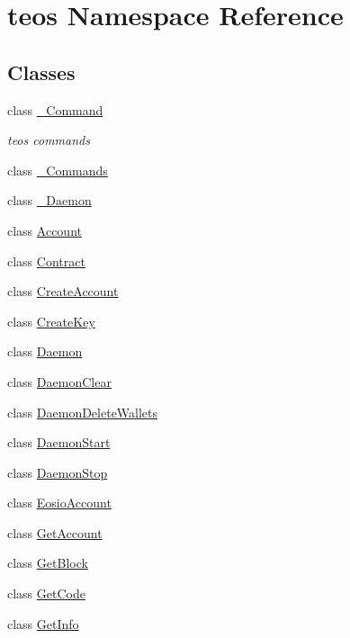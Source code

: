 \hypertarget{namespaceteos}{}\section{teos Namespace Reference}
\label{namespaceteos}
\subsection*{Classes}
\begin{DoxyCompactItemize}
\item 
class \mbox{\hyperlink{classteos_1_1__Command}{\+\_\+\+Command}}
\begin{DoxyCompactList}\small\item\em teos commands \end{DoxyCompactList}\item 
class \mbox{\hyperlink{classteos_1_1__Commands}{\+\_\+\+Commands}}
\item 
class \mbox{\hyperlink{classteos_1_1__Daemon}{\+\_\+\+Daemon}}
\item 
class \mbox{\hyperlink{classteos_1_1Account}{Account}}
\item 
class \mbox{\hyperlink{classteos_1_1Contract}{Contract}}
\item 
class \mbox{\hyperlink{classteos_1_1CreateAccount}{Create\+Account}}
\item 
class \mbox{\hyperlink{classteos_1_1CreateKey}{Create\+Key}}
\item 
class \mbox{\hyperlink{classteos_1_1Daemon}{Daemon}}
\item 
class \mbox{\hyperlink{classteos_1_1DaemonClear}{Daemon\+Clear}}
\item 
class \mbox{\hyperlink{classteos_1_1DaemonDeleteWallets}{Daemon\+Delete\+Wallets}}
\item 
class \mbox{\hyperlink{classteos_1_1DaemonStart}{Daemon\+Start}}
\item 
class \mbox{\hyperlink{classteos_1_1DaemonStop}{Daemon\+Stop}}
\item 
class \mbox{\hyperlink{classteos_1_1EosioAccount}{Eosio\+Account}}
\item 
class \mbox{\hyperlink{classteos_1_1GetAccount}{Get\+Account}}
\item 
class \mbox{\hyperlink{classteos_1_1GetBlock}{Get\+Block}}
\item 
class \mbox{\hyperlink{classteos_1_1GetCode}{Get\+Code}}
\item 
class \mbox{\hyperlink{classteos_1_1GetInfo}{Get\+Info}}
\item 

\end{DoxyCompactItemize}
